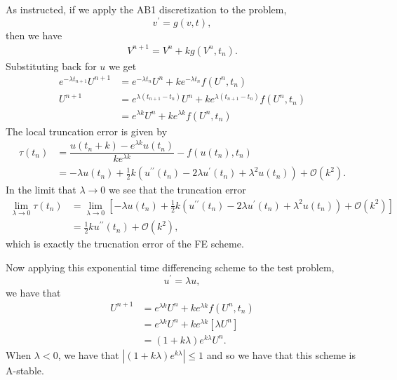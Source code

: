 \documentclass[12pt]{article}
\newcommand{\bO}{\mathcal{O}}
\begin{document}
As instructed, if we apply the AB1 discretization to the problem, \[ v^{\prime} = g(v,t),\] then we have 
\begin{align}
V^{n+1} = V^{n} + k g(V^{n},t_{n}).
\end{align}
Substituting back for $u$ we get
\begin{subequations}
    \begin{align}
    e^{-\lambda t_{n+1}}U^{n+1} &= e^{-\lambda t_{n}}U^{n} + k e^{-\lambda t_{n}}f(U^{n},t_{n})\\
    U^{n+1} &= e^{\lambda (t_{n+1}-t_{n})}U^{n} + k e^{\lambda (t_{n+1}-t_{n})}f(U^{n},t_{n})\\
    &= e^{\lambda k}U^{n} + k e^{\lambda k}f(U^{n},t_{n})
    \end{align}
\end{subequations}
The local truncation error is given by 
\begin{subequations}
    \begin{align}
        \tau(t_{n}) &= \dfrac{u(t_{n}+k)-e^{\lambda k}u(t_{n})}{ke^{\lambda k}}-f(u(t_{n}),t_{n})\\
        &= -\lambda  u(t_{n})+\frac{1}{2}k \left(u^{\prime\prime}(t_{n})-2 \lambda u^{\prime}(t_{n})+\lambda^2 u(t_{n})\right)+\bO\left(k^2\right).
    \end{align}    
\end{subequations}
In the limit that $\lambda\to 0$ we see that the truncation error 
\begin{subequations}
    \begin{align}
        \lim\limits_{\lambda\to 0}\tau(t_{n}) &= \lim\limits_{\lambda\to 0}\left[-\lambda  u(t_{n})+\frac{1}{2}k \left(u^{\prime\prime}(t_{n})-2 \lambda u^{\prime}(t_{n})+\lambda^2 u(t_{n})\right)+\bO\left(k^2\right)\right]\\
        &= \frac{1}{2}k u^{\prime\prime}(t_{n})+\bO\left(k^2\right),
    \end{align}
\end{subequations}
which is exactly the trucnation error of the FE scheme.

Now applying this exponential time differencing scheme to the test problem, \[u^{\prime} = \lambda u,\]
we have that 
\begin{subequations}
    \begin{align}
        U^{n+1} &= e^{\lambda k}U^{n} + k e^{\lambda k}f(U^{n},t_{n})\\
        &= e^{\lambda k}U^{n} + k e^{\lambda k}\left[\lambda U^{n}\right]\\
        &= (1+k\lambda)e^{k\lambda}U^{n}.
    \end{align}
\end{subequations}
When $\lambda < 0$, we have that $|(1+k\lambda)e^{k\lambda}|\le 1$ and so we have that this scheme is A-stable. 
\end{document}
